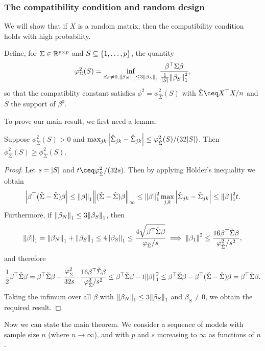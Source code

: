 \subsubsection*{The compatibility condition and random design}
We will show that if $X$ is a random matrix, then the compatibility condition holds with high probability. 

Define, for $\Sigma \in \mathbb R^{p \times p}$ and $S \subseteq \qty{1, \dotsc, p}$, the quantity
\[
\varphi_\Sigma^2(S) = \inf_{\beta_S \neq 0, \norm{\beta_N}_1 \leq 3 \norm{\beta_S}_1} \frac{\beta^\top \Sigma\beta}{\frac1{\abs{S}}\norm{\beta_S}_1^2},
\]
so that the compatiblity constant satisfies $\phi^2 = \phi_{\hat\Sigma}^2(S)$ with $\hat\Sigma \ceq X\T X /n $ and $S$ the support of $\beta^0$. 

To prove our main result, we first need a lemma:
\begin{lemma}
	Suppose $\phi_{\check\Sigma}^2(S) > 0$ and $\max_{jk} \abs{\hat\Sigma_{jk} - \check\Sigma_{jk}} \leq \varphi_{\check\Sigma}^2(S) / (32\abs{S})$. Then $\phi_{\hat\Sigma}^2(S) \geq \phi_{\check\Sigma}^2(S)$. 
\end{lemma}

\begin{proof}
	Let $s = \abs{S}$ and $t \ceq \phi_{\check\Sigma}^2/(32s)$. Then by applying H\"older's inequality we obtain
	\[
	\abs{\beta^\top (\check\Sigma - \hat\Sigma)\beta} \leq \norm{\beta}_1 \norm{(\check\Sigma - \hat\Sigma)\beta}_\infty \leq \norm{\beta}_1^2 \max_{j,k} \abs{\hat\Sigma_{jk} - \check\Sigma_{jk}}  \leq \norm{\beta}_1^2 t. 
	\]
	Furthermore, if $\norm{\beta_N}_1 \leq 3 \norm{\beta_S}_1$, then
	\[
	\norm{\beta}_1 = \norm{\beta_N}_1 + \norm{\beta_S}_1 \leq 4 \norm{\beta_S}_1 \leq \frac{4\sqrt{\beta^\top \check\Sigma\beta}}{\varphi_{\check\Sigma} / s} \implies \norm{\beta_1}^2 \leq \frac{16 \beta^\top \check\Sigma\beta}{\varphi_{\check\Sigma}^2/s^2},
	\]
	and therefore
	\[
	\frac12 \beta^\top \check\Sigma\beta = \beta^\top \check\Sigma\beta - \frac{\varphi_{\check\Sigma}^2}{32s} \cdot \frac{16 \beta^\top \check\Sigma\beta}{\varphi_{\check\Sigma}^2/s^2} \leq \beta^\top \check\Sigma \beta -  t \norm{\beta}_1^2 \leq \beta^\top\check\Sigma\beta - \beta^\top(\check\Sigma - \hat\Sigma)\beta = \beta^\top \hat\Sigma\beta. 
	\]
	Taking the infimum over all $\beta$ with $\norm{\beta_N}_1 \leq 3 \norm{\beta_S}_1$ and $\beta_S \neq 0$, we obtain the required result. 
\end{proof}

Now we can state the main theorem. We consider a sequence of models with sample size $n$ (where $n\to\infty$), and with $p$ and $s$ increasing to $\infty$ as functions of $n$. 

